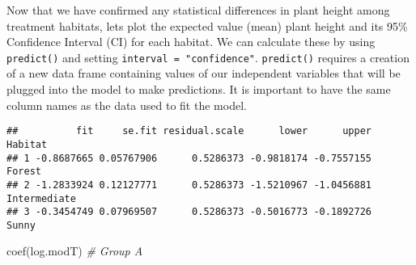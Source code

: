 \documentclass[
]{article}
\newenvironment{Shaded}{\begin{snugshade}}{\end{snugshade}}
\newcommand{\AttributeTok}[1]{\textcolor[rgb]{0.77,0.63,0.00}{#1}}
\newcommand{\CommentTok}[1]{\textcolor[rgb]{0.56,0.35,0.01}{\textit{#1}}}
\newcommand{\ConstantTok}[1]{\textcolor[rgb]{0.00,0.00,0.00}{#1}}
\newcommand{\FloatTok}[1]{\textcolor[rgb]{0.00,0.00,0.81}{#1}}
\newcommand{\FunctionTok}[1]{\textcolor[rgb]{0.00,0.00,0.00}{#1}}
\newcommand{\NormalTok}[1]{#1}
\newcommand{\OtherTok}[1]{\textcolor[rgb]{0.56,0.35,0.01}{#1}}
\newcommand{\SpecialCharTok}[1]{\textcolor[rgb]{0.00,0.00,0.00}{#1}}
\newcommand{\StringTok}[1]{\textcolor[rgb]{0.31,0.60,0.02}{#1}}
\begin{document}
Now that we have confirmed any statistical differences in plant height
among treatment habitats, lets plot the expected value (mean) plant
height and its 95\% Confidence Interval (CI) for each habitat. We can
calculate these by using \texttt{predict()} and setting
\texttt{interval\ =\ "confidence"}. \texttt{predict()} requires a
creation of a new data frame containing values of our independent
variables that will be plugged into the model to make predictions. It is
important to have the same column names as the data used to fit the
model.

\begin{Shaded}
\end{Shaded}

\begin{verbatim}
##          fit     se.fit residual.scale      lower      upper      Habitat
## 1 -0.8687665 0.05767906      0.5286373 -0.9818174 -0.7557155       Forest
## 2 -1.2833924 0.12127771      0.5286373 -1.5210967 -1.0456881 Intermediate
## 3 -0.3454749 0.07969507      0.5286373 -0.5016773 -0.1892726        Sunny
\end{verbatim}

\begin{Shaded}
\begin{Highlighting}[]
\FunctionTok{coef}\NormalTok{(log.modT) }\CommentTok{\# Group A}
\end{Highlighting}
\end{Shaded}
\end{document}
